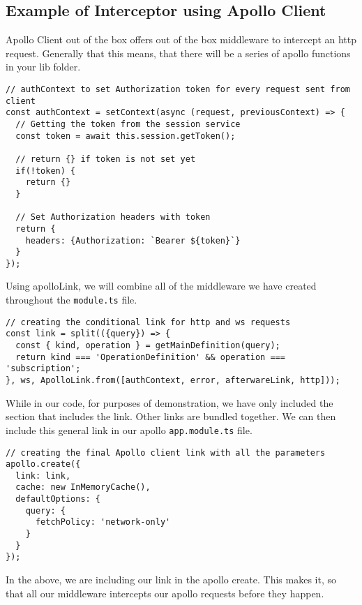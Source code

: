 \subsection{Example of Interceptor using Apollo Client}
Apollo Client out of the box offers out of the box middleware to intercept an
http request. Generally that this means, that there will be a series of 
apollo functions in your lib folder. 

\begin{lstlisting}
// authContext to set Authorization token for every request sent from client
const authContext = setContext(async (request, previousContext) => {
  // Getting the token from the session service
  const token = await this.session.getToken();

  // return {} if token is not set yet
  if(!token) {
    return {}
  }

  // Set Authorization headers with token
  return {
    headers: {Authorization: `Bearer ${token}`}
  }
});
\end{lstlisting}

Using apolloLink, we will combine all of the middleware we have created 
throughout the \lstinline{module.ts} file. 

\begin{lstlisting}
// creating the conditional link for http and ws requests
const link = split(({query}) => {
  const { kind, operation } = getMainDefinition(query);
  return kind === 'OperationDefinition' && operation === 'subscription';
}, ws, ApolloLink.from([authContext, error, afterwareLink, http]));
\end{lstlisting}

While in our code, for purposes of demonstration, we have only included the
section that includes the link. Other links are bundled together. We can 
then include this general link in our apollo \lstinline{app.module.ts} file.

\begin{lstlisting}
// creating the final Apollo client link with all the parameters
apollo.create({
  link: link,
  cache: new InMemoryCache(),
  defaultOptions: {
    query: {
      fetchPolicy: 'network-only'
    }
  }
});
\end{lstlisting}

In the above, we are including our link in the apollo create. This makes it, so
that all our middleware intercepts our apollo requests before they happen. 

